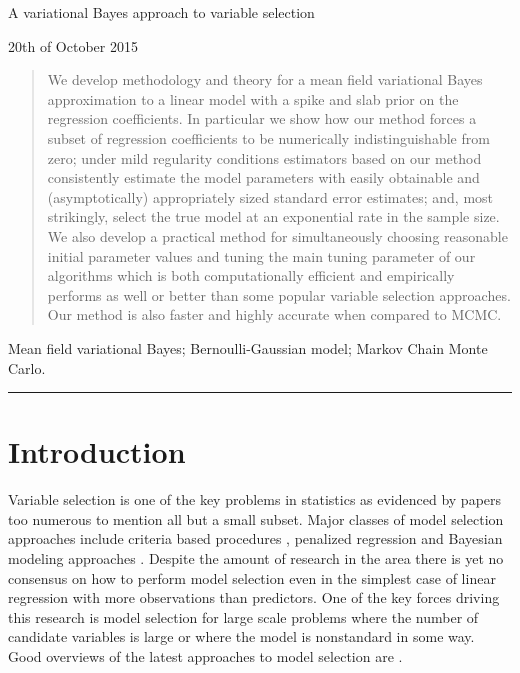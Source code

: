 \documentclass[11pt]{article}
\newtheorem{Main Result}{Main Result}
\newcommand{\joc}[1]{{\color{black}#1}}
\begin{document}
\centerline{\sf\Large A variational Bayes approach to variable selection}
\medskip

\medskip
\centerline{20th of October 2015}
 

\begin{abstract}
\noindent 
We develop methodology and theory for a mean field
variational Bayes approximation to a linear model with a spike and slab prior on
the regression coefficients. In particular we show how our method forces a
subset of regression coefficients to be numerically indistinguishable from zero;
under mild regularity conditions estimators based on our method consistently
estimate the model parameters with easily obtainable and \joc{(asymptotically)} 
appropriately sized
standard error estimates; and, most strikingly, select the true model at \joc{an}
exponential rate in the sample size. We also develop a practical method for
simultaneously choosing reasonable initial parameter values and tuning the
main tuning parameter of our algorithms which is both computationally efficient
and empirically performs as well or better than some popular variable selection
approaches. Our method is also faster and highly accurate when compared to MCMC.
\end{abstract}



\medskip
{}  Mean field variational Bayes; \joc{Bernoulli-Gaussian model};  Markov \joc{C}hain Monte Carlo.
\medskip
\hrule






\section{Introduction}



Variable selection is one of the key problems in statistics as evidenced by
papers too numerous to mention all but a small subset. Major classes of model
selection approaches include criteria based procedures
\citep{Akaike1973,Mallows1973,Schwarz1978}, penalized regression
\citep{Tibshirani1996,Fan2001,Fan2004} and Bayesian modeling approaches
\citep{Bottolo2010,Hans2007,Li2010,Stingo2011}. Despite the amount of
research in the area there is yet no consensus on how to perform model
selection even in the simplest case of linear regression with
more observations than predictors.
One of the key forces driving
this research is model selection for large scale problems where the number of
candidate variables is large or where the model is nonstandard in some way.
Good overviews of the latest approaches to model selection are
\cite{JohnstoneTitterington2009,FanLv2010,Muller2010,BuhlmannVanDeGeer2011,JohnsonRossell2013}.
\end{document}
